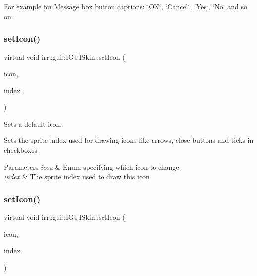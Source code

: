 For example for Message box button captions\+: \char`\"{}\+O\+K\char`\"{}, \char`\"{}\+Cancel\char`\"{}, \char`\"{}\+Yes\char`\"{}, \char`\"{}\+No\char`\"{} and so on. \mbox{\label{classirr_1_1gui_1_1IGUISkin_a7994f1001681b5eabf398b5c4c24c304}} 
\subsubsection{\texorpdfstring{set\+Icon()}{setIcon()}\hspace{0.1cm}{\footnotesize\ttfamily [1/2]}}
{\footnotesize\ttfamily virtual void irr\+::gui\+::\+I\+G\+U\+I\+Skin\+::set\+Icon (\begin{DoxyParamCaption}\item[{\hyperlink{namespaceirr_1_1gui_a8e54aa253459daf0b62670bda4556d9f}{E\+G\+U\+I\+\_\+\+D\+E\+F\+A\+U\+L\+T\+\_\+\+I\+C\+ON}}]{icon,  }\item[{\hyperlink{namespaceirr_a0416a53257075833e7002efd0a18e804}{u32}}]{index }\end{DoxyParamCaption})\hspace{0.3cm}{\ttfamily [pure virtual]}}



Sets a default icon. 

Sets the sprite index used for drawing icons like arrows, close buttons and ticks in checkboxes 
\begin{DoxyParams}{Parameters}
{\em icon} & Enum specifying which icon to change \\
\hline
{\em index} & The sprite index used to draw this icon \\
\hline
\end{DoxyParams}
\mbox{\label{classirr_1_1gui_1_1IGUISkin_a7994f1001681b5eabf398b5c4c24c304}} 
\subsubsection{\texorpdfstring{set\+Icon()}{setIcon()}\hspace{0.1cm}{\footnotesize\ttfamily [2/2]}}
{\footnotesize\ttfamily virtual void irr\+::gui\+::\+I\+G\+U\+I\+Skin\+::set\+Icon (\begin{DoxyParamCaption}\item[{\hyperlink{namespaceirr_1_1gui_a8e54aa253459daf0b62670bda4556d9f}{E\+G\+U\+I\+\_\+\+D\+E\+F\+A\+U\+L\+T\+\_\+\+I\+C\+ON}}]{icon,  }\item[{\hyperlink{namespaceirr_a0416a53257075833e7002efd0a18e804}{u32}}]{index }\end{DoxyParamCaption})\hspace{0.3cm}{\ttfamily [pure virtual]}}



